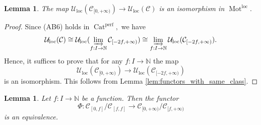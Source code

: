 \documentclass[11pt,leqno]{amsart}
\newtheorem{lemma}[theo]{Lemma}
\numberwithin{equation}{section}
\def\N{\mathbb{N}}
\newcommand{\indlim}[1][]{\mathop{\varinjlim}\limits_{#1}}
\newcommand{\Mot}{\operatorname{Mot}}
\newcommand{\Cat}{\operatorname{Cat}}
\newcommand{\loc}{\operatorname{loc}}
\newcommand{\cC}{{\mathcal C}}
\newcommand{\cU}{{\mathcal U}}
\newcommand{\perf}{\operatorname{perf}}
\begin{document}
\begin{lemma}\label{lem:product_of_prestab}\cite[Proof of Proposition 2.7]{Cor} The map $\cU_{\loc}(\cC_{[0,+\infty)})\to \cU_{\loc}(\cC)$ is an isomorphism in $\Mot^{\loc}.$\end{lemma}

\begin{proof}Since (AB6) holds in $\Cat^{\perf},$ we have
$$\cU_{\loc}(\cC)\cong \cU_{\loc}(\indlim[f:I\to\N]\cC_{[-2f,+\infty)})\cong \indlim[f:I\to\N] \cU_{\loc}(\cC_{[-2f,+\infty)}).$$
Hence, it suffices to prove that for any $f:I\to \N$ the map $$\cU_{\loc}(\cC_{[0,+\infty)})\to \cU_{\loc}(\cC_{[-2f,+\infty)})$$
is an isomorphism. This follows from Lemma \ref{lem:functors_with_same_class}.\end{proof}

\begin{lemma}\label{lem:equivalence_of_quotients}\cite[Proof of Proposition 2.10]{Cor} Let $f:I\to\N$ be a function. Then the functor $$\Phi:\cC_{[0,f]}/\cC_{[f,f]}\to\cC_{[0,+\infty)}/\cC_{[f,+\infty)}$$
is an equivalence.\end{lemma}
\end{document}
